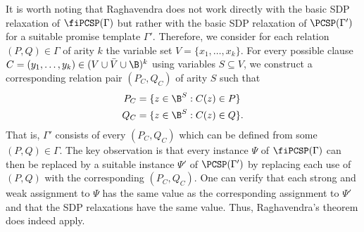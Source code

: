 {
\begin{remark}\label{rem:Ragh}
It is worth noting that Raghavendra does not work directly with the basic SDP relaxation of $\fiPCSP(\Gamma)$ but rather with the basic SDP relaxation of $\PCSP(\Gamma')$ for a suitable promise template $\Gamma'$. Therefore, we consider for each relation $(P, Q) \in \Gamma$ of arity $k$ the variable set $V = \{x_1, \hdots, x_k\}$. For every possible clause $C = (y_1, \hdots, y_k) \in (V \cup \bar{V} \cup \B)^k$ using variables $S \subseteq V$, we construct a corresponding relation pair $(P_C, Q_C)$ of arity $S$ such that
\begin{align*}
    P_C &= \{z \in \B^{S} : C(z) \in P\}\\
    Q_C &= \{z \in \B^{S} : C(z) \in Q\}.
\end{align*}
That is, $\Gamma'$ consists of every $(P_C, Q_C)$ which can be defined from some $(P, Q) \in \Gamma$. The key observation is that every instance $\Psi$ of $\fiPCSP(\Gamma)$ can then be replaced by a suitable instance $\Psi'$ of $\PCSP(\Gamma')$ by replacing each use of $(P,Q)$ with the corresponding $(P_C, Q_C)$. One can verify that each strong and weak assignment to $\Psi$ has the same value as the corresponding assignment to $\Psi'$ and that the SDP relaxations have the same value. Thus, Raghavendra's theorem does indeed apply.
\end{remark}
}
